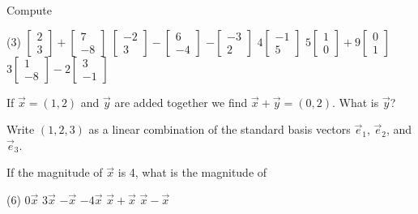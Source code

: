 \begin{exercise}
Compute
\begin{tasks}(3)
\task
$\begin{bmatrix}
2 \\
3 
\end{bmatrix}
+
\begin{bmatrix}
7 \\
-8
\end{bmatrix}
$
\task
$\begin{bmatrix}
-2 \\
3 
\end{bmatrix}
-
\begin{bmatrix}
6 \\
-4
\end{bmatrix}
$
\task
$
-\begin{bmatrix}
-3 \\
2 
\end{bmatrix}
$
\task
$
4\begin{bmatrix}
-1 \\
5 
\end{bmatrix}
$
\task
$
5\begin{bmatrix}
1 \\
0 
\end{bmatrix}
+
9
\begin{bmatrix}
0 \\
1
\end{bmatrix}
$
\task
$
3\begin{bmatrix}
1 \\
-8 
\end{bmatrix}
-
2
\begin{bmatrix}
3 \\
-1
\end{bmatrix}
$
\end{tasks}
\end{exercise}

\begin{exercise}
If $\vec{x} = (1,2)$ and $\vec{y}$ are added together we find
$\vec{x}+\vec{y} = (0,2)$.  What is $\vec{y}$?
\end{exercise}

\begin{exercise}
Write $(1,2,3)$ as a linear combination of the standard basis vectors
$\vec{e}_1$, $\vec{e}_2$, and $\vec{e}_3$.
\end{exercise}

\begin{exercise}
If the magnitude of $\vec{x}$ is 4, what is the magnitude of
\begin{tasks}(6)
\task
$0\vec{x}$
\task
$3\vec{x}$
\task
$-\vec{x}$
\task
$-4\vec{x}$
\task
$\vec{x}+\vec{x}$
\task
$\vec{x}-\vec{x}$
\end{tasks}
\end{exercise}

